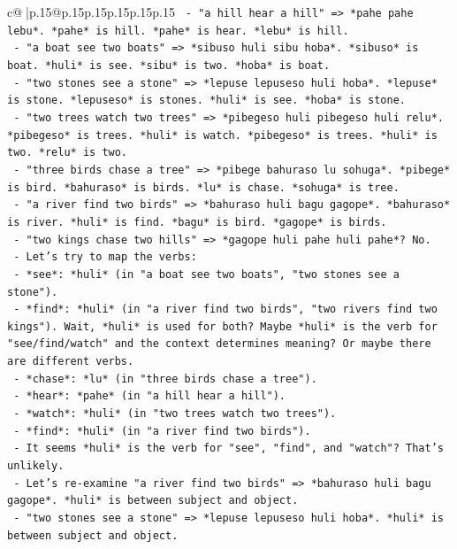 \documentclass{article}
\begin{document}
{\begin{supertabular}{c@{$\;$}|p{.15\linewidth}@{}p{.15\linewidth}p{.15\linewidth}p{.15\linewidth}p{.15\linewidth}p{.15\linewidth}}
{{{\texttt{    {-} "a hill hear a hill" => *pahe pahe lebu*. *pahe* is hill. *pahe* is hear. *lebu* is hill.} \\
\texttt{    {-} "a boat see two boats" => *sibuso huli sibu hoba*. *sibuso* is boat. *huli* is see. *sibu* is two. *hoba* is boat.} \\
\texttt{    {-} "two stones see a stone" => *lepuse lepuseso huli hoba*. *lepuse* is stone. *lepuseso* is stones. *huli* is see. *hoba* is stone.} \\
\texttt{    {-} "two trees watch two trees" => *pibegeso huli pibegeso huli relu*. *pibegeso* is trees. *huli* is watch. *pibegeso* is trees. *huli* is two. *relu* is two.} \\
\texttt{    {-} "three birds chase a tree" => *pibege bahuraso lu sohuga*. *pibege* is bird. *bahuraso* is birds. *lu* is chase. *sohuga* is tree.} \\
\texttt{    {-} "a river find two birds" => *bahuraso huli bagu gagope*. *bahuraso* is river. *huli* is find. *bagu* is bird. *gagope* is birds.} \\
\texttt{    {-} "two kings chase two hills" => *gagope huli pahe huli pahe*? No.} \\
\texttt{    {-} Let's try to map the verbs:} \\
\texttt{      {-} *see*: *huli* (in "a boat see two boats", "two stones see a stone").} \\
\texttt{      {-} *find*: *huli* (in "a river find two birds", "two rivers find two kings"). Wait, *huli* is used for both? Maybe *huli* is the verb for "see/find/watch" and the context determines meaning? Or maybe there are different verbs.} \\
\texttt{      {-} *chase*: *lu* (in "three birds chase a tree").} \\
\texttt{      {-} *hear*: *pahe* (in "a hill hear a hill").} \\
\texttt{      {-} *watch*: *huli* (in "two trees watch two trees").} \\
\texttt{      {-} *find*: *huli* (in "a river find two birds").} \\
\texttt{      {-} It seems *huli* is the verb for "see", "find", and "watch"? That's unlikely.} \\
\texttt{      {-} Let's re{-}examine "a river find two birds" => *bahuraso huli bagu gagope*. *huli* is between subject and object.} \\
\texttt{      {-} "two stones see a stone" => *lepuse lepuseso huli hoba*. *huli* is between subject and object.} \\
}}}
\end{supertabular}}
\end{document}
